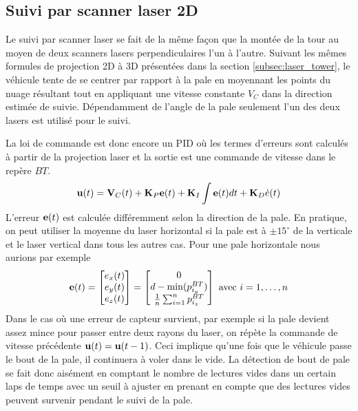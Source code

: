 \subsection{Suivi par scanner laser 2D}
\label{subsec:laser_blade}

Le suivi par scanner laser se fait de la même façon que la montée de la tour au moyen de deux scanners lasers perpendiculaires l'un à l'autre. Suivant les mêmes formules de projection 2D à 3D présentées dans la section \ref{subsec:laser_tower}, le véhicule tente de se centrer par rapport à la pale en moyennant les points du nuage résultant tout en appliquant une vitesse constante $V_C$ dans la direction estimée de suivie. Dépendamment de l'angle de la pale seulement l'un des deux lasers est utilisé pour le suivi.

La loi de commande est donc encore un PID où les termes d'erreurs sont calculés à partir de la projection laser et la sortie est une commande de vitesse dans le repère ${BT}$.
\begin{align}
  \mathbf{u}(t) = \mathbf{V}_C(t) + \mathbf{K}_P \mathbf{e}(t) + \mathbf{K}_I\int{\mathbf{e}(t)dt} + \mathbf{K}_D\dot{e}(t)
  \label{eq:pid_laser_blade}
\end{align}
L'erreur $\mathbf{e}(t)$ est calculée différemment selon la direction de la pale. En pratique, on peut utiliser la moyenne du laser horizontal si la pale est à $\pm15^{\circ}$ de la verticale et le laser vertical dans tous les autres cas. Pour une pale horizontale nous aurions par exemple
\[
\mathbf{e}(t) = \begin{bmatrix}e_x(t) \\ e_y(t) \\ e_z(t)\end{bmatrix} =
\begin{bmatrix}
0 \\ d - \min(p^{BT}_{i_y}) \\ \frac{1}{n}\sum_{i=1}^{n}p^{BT}_{i_z}
\end{bmatrix} \text{ avec } i=1,\ldots,n
\]
Dans le cas où une erreur de capteur survient, par exemple si la pale devient assez mince pour passer entre deux rayons du laser, on répète la commande de vitesse précédente $\mathbf{u}(t) = \mathbf{u}(t-1)$. Ceci implique qu'une fois que le véhicule passe le bout de la pale, il continuera à voler dans le vide. La détection de bout de pale se fait donc aisément en comptant le nombre de lectures vides dans un certain laps de temps avec un seuil à ajuster en prenant en compte que des lectures vides peuvent survenir pendant le suivi de la pale.


